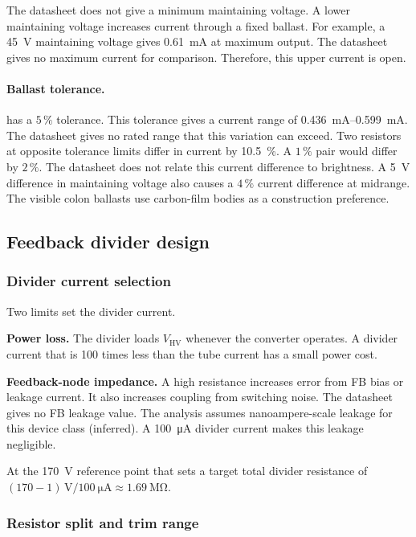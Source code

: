 The datasheet does not give a minimum maintaining voltage. A lower maintaining
voltage increases current through a fixed ballast. For example, a
\SI{45}{\volt} maintaining voltage gives \SI{0.61}{\milli\ampere} at maximum
output. The datasheet gives no maximum current for comparison. Therefore, this
upper current is open.

\paragraph{Ballast tolerance.}  has a $5\,\%$ tolerance. This
tolerance gives a current range of \SIrange{0.436}{0.599}{\milli\ampere}. The
datasheet gives no rated range that this variation can exceed. Two resistors at
opposite tolerance limits differ in current by \SI{10.5}{\percent}. A $1\,\%$
pair would differ by $2\,\%$. The datasheet does not relate this current
difference to brightness. A \SI{5}{\volt} difference in maintaining voltage
also causes a $4\,\%$ current difference at midrange. The visible colon
ballasts use carbon-film bodies as a construction preference.

\subsection{Feedback divider design}\label{sec:hv-divider}

\subsubsection{Divider current selection}\label{sec:hv-divider-current}

Two limits set the divider current.

\textbf{Power loss.} The divider loads $V_{\mathrm{HV}}$ whenever the converter
operates. A divider current that is 100 times less than the tube current has a
small power cost.

\textbf{Feedback-node impedance.} A high resistance increases error from FB
bias or leakage current. It also increases coupling from switching noise. The
datasheet gives no FB leakage value. The analysis assumes nanoampere-scale
leakage for this device class (inferred). A \SI{100}{\micro\ampere} divider
current makes this leakage negligible.

At the \SI{170}{\volt} reference point that sets a target total divider
resistance of $(170-1)\,\si{\volt}/\SI{100}{\micro\ampere} \approx
\SI{1.69}{\mega\ohm}$.

\subsubsection{Resistor split and trim range}\label{sec:hv-divider-split}

